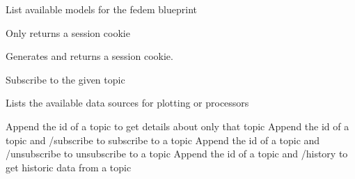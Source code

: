 \documentclass[letterpaper,10pt,english]{sphinxmanual}
\begin{document}
\begin{fulllineitems}
\label{\detokenize{src:src.views.models}}
List available models for the fedem blueprint

\end{fulllineitems}


\begin{fulllineitems}
\label{\detokenize{src:src.views.session_endpoint}}
Only returns a session cookie

Generates and returns a session cookie.

\end{fulllineitems}


\begin{fulllineitems}
\label{\detokenize{src:src.views.subscribe}}
Subscribe to the given topic

\end{fulllineitems}


\begin{fulllineitems}
\label{\detokenize{src:src.views.topics}}
Lists the available data sources for plotting or processors

Append the id of a topic to get details about only that topic
Append the id of a topic and /subscribe to subscribe to a topic
Append the id of a topic and /unsubscribe to unsubscribe to a topic
Append the id of a topic and /history to get historic data from a topic

\end{fulllineitems}
\end{document}
